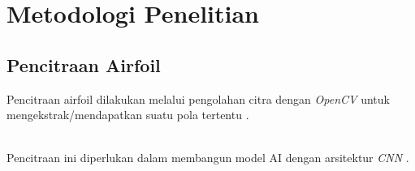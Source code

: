 \section{Metodologi Penelitian}
\subsection{Pencitraan Airfoil}
\begin{frame}
  Pencitraan airfoil dilakukan melalui pengolahan citra dengan \textit{OpenCV} untuk mengekstrak/mendapatkan suatu pola tertentu \cite{druzhkov2011new}.\\~\\
  \pause

  Pencitraan ini diperlukan dalam membangun model AI dengan arsitektur \textit{CNN} \cite{albawi2017understanding}.\\~\\
\end{frame}

